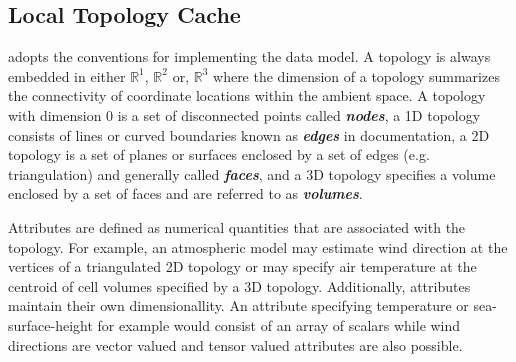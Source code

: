 \subsection{Local Topology Cache}

\sciwms{} adopts the \cfugrid{} conventions for implementing the data
model. A topology is always embedded in either $\mathbb{R}^1$,
$\mathbb{R}^2$ or, $\mathbb{R}^3$ where the dimension of a topology
summarizes the connectivity of coordinate locations within the ambient
space. A topology with dimension 0 is a set of disconnected points
called \textbf{\textit{nodes}}, a 1D topology consists of lines or curved
boundaries known as \textbf{\textit{edges}} in \cfugrid{} documentation, a 2D
topology is a set of planes or surfaces enclosed by a set of edges
(e.g. triangulation) and generally called \textbf{\textit{faces}}, and
a 3D topology specifies a volume enclosed by a set of faces and are
referred to as \textbf{\textit{volumes}}.

Attributes are defined as numerical quantities that are associated
with the topology. For example, an atmospheric model may estimate wind
direction at the vertices of a triangulated 2D topology or may specify
air temperature at the centroid of cell volumes specified by a 3D
topology. Additionally, attributes maintain their own
dimensionallity. An attribute specifying temperature or
sea-surface-height for example would consist of an array of scalars
while wind directions are vector valued and tensor valued attributes
are also possible.
